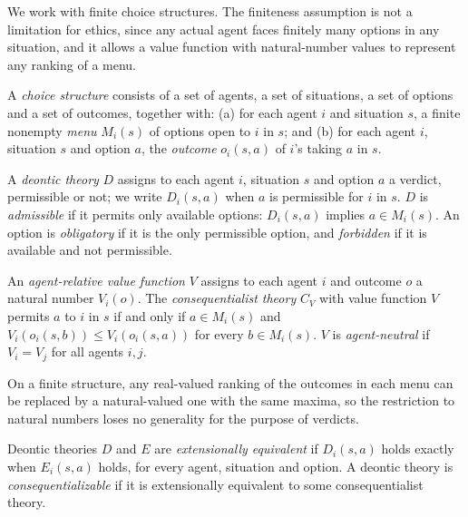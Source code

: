 \documentclass{situationist-preprint}
\begin{document}
We work with finite choice structures. The finiteness assumption is not a limitation for ethics, since any actual agent faces finitely many options in any situation, and it allows a value function with natural-number values to represent any ranking of a menu.

\begin{definition}\label{d:structure}
A \emph{choice structure} consists of a set of agents, a set of situations, a set of options and a set of outcomes, together with: (a) for each agent $i$ and situation $s$, a finite nonempty \emph{menu} $M_i(s)$ of options open to $i$ in $s$; and (b) for each agent $i$, situation $s$ and option $a$, the \emph{outcome} $o_i(s,a)$ of $i$'s taking $a$ in $s$.
\end{definition}

\begin{definition}\label{d:deontic}
A \emph{deontic theory} $D$ assigns to each agent $i$, situation $s$ and option $a$ a verdict, permissible or not; we write $D_i(s,a)$ when $a$ is permissible for $i$ in $s$. $D$ is \emph{admissible} if it permits only available options: $D_i(s,a)$ implies $a \in M_i(s)$. An option is \emph{obligatory} if it is the only permissible option, and \emph{forbidden} if it is available and not permissible.
\end{definition}

\begin{definition}\label{d:conseq}
An \emph{agent-relative value function} $V$ assigns to each agent $i$ and outcome $o$ a natural number $V_i(o)$. The \emph{consequentialist theory} $C_V$ with value function $V$ permits $a$ to $i$ in $s$ if and only if $a \in M_i(s)$ and $V_i(o_i(s,b)) \leq V_i(o_i(s,a))$ for every $b \in M_i(s)$. $V$ is \emph{agent-neutral} if $V_i = V_j$ for all agents $i,j$.
\end{definition}

On a finite structure, any real-valued ranking of the outcomes in each menu can be replaced by a natural-valued one with the same maxima, so the restriction to natural numbers loses no generality for the purpose of verdicts.

\begin{definition}\label{d:equiv}
Deontic theories $D$ and $E$ are \emph{extensionally equivalent} if $D_i(s,a)$ holds exactly when $E_i(s,a)$ holds, for every agent, situation and option. A deontic theory is \emph{consequentializable} if it is extensionally equivalent to some consequentialist theory.
\end{definition}
\end{document}
